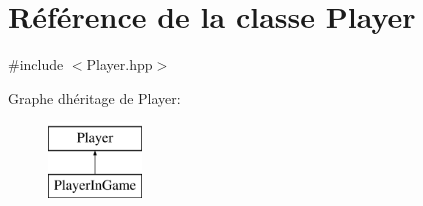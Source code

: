 \hypertarget{classPlayer}{}\section{Référence de la classe Player}
\label{classPlayer}


{\ttfamily \#include $<$Player.\+hpp$>$}

Graphe d\textquotesingle{}héritage de Player\+:\begin{figure}[H]
\begin{center}
\leavevmode
\includegraphics[height=2.000000cm]{classPlayer}
\end{center}
\end{figure}
